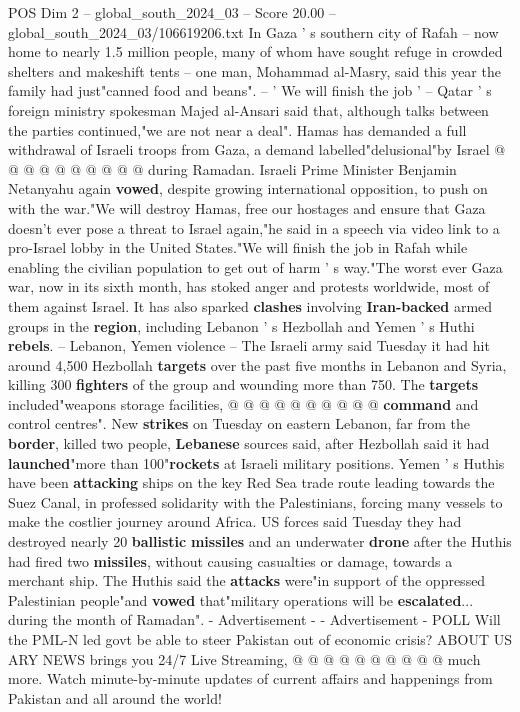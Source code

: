 \begin{textsample}{POS Dim 2 – global\_south\_2024\_03 – Score 20.00 – global\_south\_2024\_03/106619206.txt}
In Gaza ' s southern city of Rafah -- now home to nearly 1.5 million people, many of whom have sought refuge in crowded shelters and makeshift tents -- one man, Mohammad al-Masry, said this year the family had just"canned food and beans". -- ' We will finish the job ' -- Qatar ' s foreign ministry spokesman Majed al-Ansari said that, although talks between the parties continued,"we are not near a deal".
Hamas has demanded a full withdrawal of Israeli troops from Gaza, a demand labelled"delusional"by Israel @ @ @ @ @ @ @ @ @ @ during Ramadan.
Israeli Prime Minister Benjamin Netanyahu again \textbf{vowed}, despite growing international opposition, to push on with the war."We will destroy Hamas, free our hostages and ensure that Gaza doesn't ever pose a threat to Israel again,"he said in a speech via video link to a pro-Israel lobby in the United States."We will finish the job in Rafah while enabling the civilian population to get out of harm ' s way."The worst ever Gaza war, now in its sixth month, has stoked anger and protests worldwide, most of them against Israel.
It has also sparked \textbf{clashes} involving \textbf{Iran-backed} armed groups in the \textbf{region}, including Lebanon ' s Hezbollah and Yemen ' s Huthi \textbf{rebels}. -- Lebanon, Yemen violence -- The Israeli army said Tuesday it had hit around 4,500 Hezbollah \textbf{targets} over the past five months in Lebanon and Syria, killing 300 \textbf{fighters} of the group and wounding more than 750.
The \textbf{targets} included"weapons storage facilities, @ @ @ @ @ @ @ @ @ @ \textbf{command} and control centres".
New \textbf{strikes} on Tuesday on eastern Lebanon, far from the \textbf{border}, killed two people, \textbf{Lebanese} sources said, after Hezbollah said it had \textbf{launched}"more than 100"\textbf{rockets} at Israeli military positions.
Yemen ' s Huthis have been \textbf{attacking} ships on the key Red Sea trade route leading towards the Suez Canal, in professed solidarity with the Palestinians, forcing many vessels to make the costlier journey around Africa.
US forces said Tuesday they had destroyed nearly 20 \textbf{ballistic} \textbf{missiles} and an underwater \textbf{drone} after the Huthis had fired two \textbf{missiles}, without causing casualties or damage, towards a merchant ship.
The Huthis said the \textbf{attacks} were"in support of the oppressed Palestinian people"and \textbf{vowed} that"military operations will be \textbf{escalated}... during the month of Ramadan". - Advertisement - - Advertisement - POLL Will the PML-N led govt be able to steer Pakistan out of economic crisis?
ABOUT US ARY NEWS brings you 24/7 Live Streaming, @ @ @ @ @ @ @ @ @ @ much more.
Watch minute-by-minute updates of current affairs and happenings from Pakistan and all around the world!

\end{textsample}
